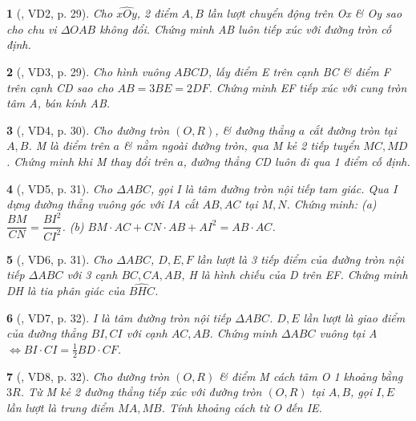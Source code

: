 \documentclass{article}
\newtheorem{baitoan}{}
\begin{document}
\begin{baitoan}[\cite{TLCT_THCS_Toan_9_hinh_hoc}, VD2, p. 29]
	Cho $\widehat{xOy}$, 2 điểm $A,B$ lần lượt chuyển động trên Ox \& Oy sao cho chu vi $\Delta OAB$ không đổi. Chứng minh AB luôn tiếp xúc với đường tròn cố định.
\end{baitoan}

\begin{baitoan}[\cite{TLCT_THCS_Toan_9_hinh_hoc}, VD3, p. 29]
	Cho hình vuông $ABCD$, lấy điểm E trên cạnh BC \& điểm F trên cạnh CD sao cho $AB = 3BE = 2DF$. Chứng minh EF tiếp xúc với cung tròn tâm A, bán kính AB.
\end{baitoan}

\begin{baitoan}[\cite{TLCT_THCS_Toan_9_hinh_hoc}, VD4, p. 30]
	Cho đường tròn $(O,R)$, \& đường thẳng $a$ cắt đường tròn tại $A,B$. M là điểm trên $a$ \& nằm ngoài đường tròn, qua M kẻ 2 tiếp tuyển $MC,MD$. Chứng minh khi M thay đổi trên $a$, đường thẳng CD luôn đi qua 1 điểm cố định.
\end{baitoan}

\begin{baitoan}[\cite{TLCT_THCS_Toan_9_hinh_hoc}, VD5, p. 31]
	Cho $\Delta ABC$, gọi I là tâm đường tròn nội tiếp tam giác. Qua I dựng đường thẳng vuông góc với IA cắt $AB,AC$ tại $M,N$. Chứng minh: (a) $\dfrac{BM}{CN} = \dfrac{BI^2}{CI^2}$. (b) $BM\cdot AC + CN\cdot AB + AI^2 = AB\cdot AC$.
\end{baitoan}

\begin{baitoan}[\cite{TLCT_THCS_Toan_9_hinh_hoc}, VD6, p. 31]
	Cho $\Delta ABC$, $D,E,F$ lần lượt là 3 tiếp điểm của đường tròn nội tiếp $\Delta ABC$ với 3 cạnh $BC,CA,AB$, H là hình chiếu của D trên EF. Chứng minh DH là tia phân giác của $\widehat{BHC}$.
\end{baitoan}

\begin{baitoan}[\cite{TLCT_THCS_Toan_9_hinh_hoc}, VD7, p. 32]
	I là tâm đường tròn nội tiếp $\Delta ABC$. $D,E$ lần lượt là giao điểm của đường thẳng $BI,CI$ với cạnh $AC,AB$. Chứng minh $\Delta ABC$ vuông tại A $\Leftrightarrow BI\cdot CI = \frac{1}{2}BD\cdot CF$.
\end{baitoan}

\begin{baitoan}[\cite{TLCT_THCS_Toan_9_hinh_hoc}, VD8, p. 32]
	Cho đường tròn $(O,R)$ \& điểm M cách tâm O 1 khoảng bằng $3R$. Từ M kẻ 2 đường thẳng tiếp xúc với đường tròn $(O,R)$ tại $A,B$, gọi $I,E$ lần lượt là trung điểm $MA,MB$. Tính khoảng cách từ O đến IE.
\end{baitoan}
\end{document}

